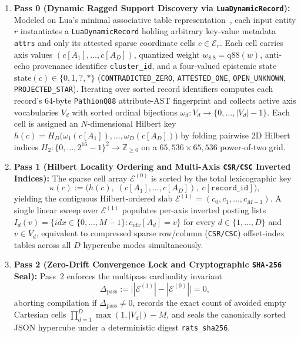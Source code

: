 \documentclass[11pt]{article}
\theoremstyle{plain}
\theoremstyle{definition}
\begin{document}
\begin{enumerate}
  \item \textbf{Pass 0 (Dynamic Ragged Support Discovery via \texttt{LuaDynamicRecord}):} Modeled on Lua's minimal associative table representation~\cite{ierusalimschy1996lua}, each input entity $r$ instantiates a \texttt{LuaDynamicRecord} holding arbitrary key-value metadata \texttt{attrs} and only its attested sparse coordinate cells $c \in \mathcal{E}_r$. Each cell carries axis values $(c[A_1], \dots, c[A_D])$, quantized weight $w_{8.8} = \mathrm{q88}(w)$, anti-echo provenance identifier \texttt{cluster\_id}, and a four-valued epistemic state $\mathrm{state}(c) \in \{0, 1, ?, *\}$ (\texttt{CONTRADICTED\_ZERO}, \texttt{ATTESTED\_ONE}, \texttt{OPEN\_UNKNOWN}, \texttt{PROJECTED\_STAR}). Iterating over sorted record identifiers computes each record's $64$-byte \texttt{PathionQ88} attribute-AST fingerprint and collects active axis vocabularies $V_d$ with sorted ordinal bijections $\omega_d : V_d \to \{0, \dots, |V_d| - 1\}$. Each cell is assigned an $N$-dimensional Hilbert key~\cite{hilbert1891,moon2001hilbert} $h(c) = H_D\bigl(\omega_1(c[A_1]), \dots, \omega_D(c[A_D])\bigr)$ by folding pairwise 2D Hilbert indices $H_2 : \{0,\dots,2^{16}-1\}^2 \to \mathbb{Z}_{\ge 0}$ on a $65{,}536 \times 65{,}536$ power-of-two grid.
  \item \textbf{Pass 1 (Hilbert Locality Ordering and Multi-Axis \texttt{CSR/CSC} Inverted Indices):} The sparse cell array $\mathcal{E}^{(0)}$ is sorted by the total lexicographic key
  \begin{equation}
    \kappa(c) := \bigl(h(c),\; (c[A_1], \dots, c[A_D]),\; c[\mathtt{record\_id}]\bigr),
  \end{equation}
  yielding the contiguous Hilbert-ordered slab $\mathcal{E}^{(1)} = (c_0, c_1, \dots, c_{M-1})$. A single linear sweep over $\mathcal{E}^{(1)}$ populates per-axis inverted posting lists $I_d(v) = \{idx \in \{0,\dots,M-1\} : c_{idx}[A_d] = v\}$ for every $d \in \{1,\dots,D\}$ and $v \in V_d$, equivalent to compressed sparse row/column (\texttt{CSR/CSC}) offset-index tables across all $D$ hypercube modes simultaneously.
  \item \textbf{Pass 2 (Zero-Drift Convergence Lock and Cryptographic \texttt{SHA-256} Seal):} Pass~2 enforces the multipass cardinality invariant
  \begin{equation}\label{eq:pass_drift}
    \Delta_{\mathrm{pass}} := \bigl||\mathcal{E}^{(1)}| - |\mathcal{E}^{(0)}|\bigr| = 0,
  \end{equation}
  aborting compilation if $\Delta_{\mathrm{pass}} \neq 0$, records the exact count of avoided empty Cartesian cells $\prod_{d=1}^D \max(1, |V_d|) - M$, and seals the canonically sorted JSON hypercube under a deterministic digest \texttt{rats\_sha256}.
\end{enumerate}
\end{document}
